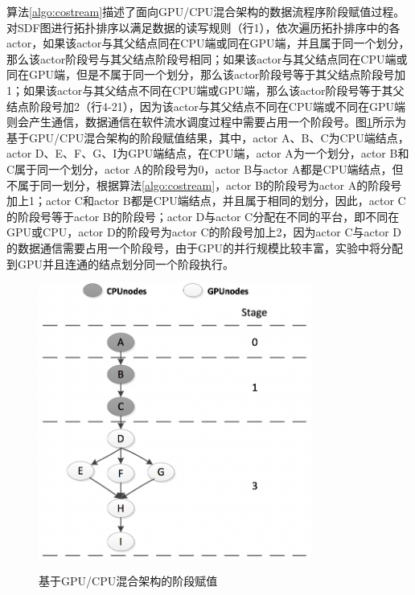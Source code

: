 算法\ref{algo:costream}描述了面向GPU/CPU混合架构的数据流程序阶段赋值过程。对SDF图进行拓扑排序以满足数据的读写规则（行1），依次遍历拓扑排序中的各actor，如果该actor与其父结点同在CPU端或同在GPU端，并且属于同一个划分，那么该actor阶段号与其父结点阶段号相同；如果该actor与其父结点同在CPU端或同在GPU端，但是不属于同一个划分，那么该actor阶段号等于其父结点阶段号加1；如果该actor与其父结点不同在CPU端或GPU端，那么该actor阶段号等于其父结点阶段号加2（行4-21），因为该actor与其父结点不同在CPU端或不同在GPU端则会产生通信，数据通信在软件流水调度过程中需要占用一个阶段号。图\ref{fig:gpucpu}所示为基于GPU/CPU混合架构的阶段赋值结果，其中，actor A、B、C为CPU端结点，actor D、E、F、G、I为GPU端结点，在CPU端，actor A为一个划分，actor B和C属于同一个划分，actor A的阶段号为0，actor B与actor A都是CPU端结点，但不属于同一划分，根据算法\ref{algo:costream}，actor B的阶段号为actor A的阶段号加上1；actor C和actor B都是CPU端结点，并且属于相同的划分，因此，actor C的阶段号等于actor B的阶段号；actor D与actor C分配在不同的平台，即不同在GPU或CPU，actor D的阶段号为actor C的阶段号加上2，因为actor C与actor D的数据通信需要占用一个阶段号，由于GPU的并行规模比较丰富，实验中将分配到GPU并且连通的结点划分同一个阶段执行。


\begin{figure}[htbp]
  \centering
  \includegraphics[width=0.8\textwidth]{Img/Chap_Application/Yu/gpucpu.png}\\
  \caption{基于GPU/CPU混合架构的阶段赋值}\label{fig:gpucpu}
\end{figure}

